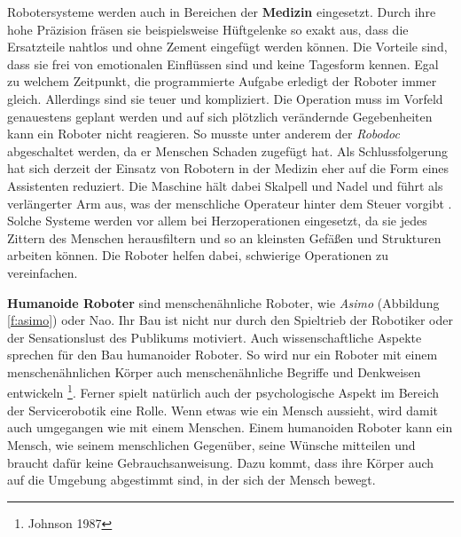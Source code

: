 Robotersysteme werden auch in Bereichen der \textbf{Medizin} eingesetzt. Durch ihre hohe Präzision fräsen sie beispielsweise Hüftgelenke so exakt aus, dass die Ersatzteile nahtlos und ohne Zement eingefügt werden können. Die Vorteile sind, dass sie frei von emotionalen Einflüssen sind und keine Tagesform kennen. Egal zu welchem Zeitpunkt, die programmierte Aufgabe erledigt der Roboter immer gleich. Allerdings sind sie teuer und kompliziert. Die Operation muss im Vorfeld genauestens geplant werden und auf sich plötzlich verändernde Gegebenheiten kann ein Roboter nicht reagieren. So musste unter anderem der \textit{Robodoc} abgeschaltet werden, da er Menschen Schaden zugefügt hat. Als Schlussfolgerung hat sich derzeit der Einsatz von Robotern in der Medizin eher auf die Form eines Assistenten reduziert. Die Maschine hält dabei Skalpell und Nadel und führt als verlängerter Arm aus, was der menschliche Operateur hinter dem Steuer vorgibt \cite{Haun2007}. Solche Systeme werden vor allem bei Herzoperationen eingesetzt, da sie jedes Zittern des Menschen herausfiltern und so an kleinsten Gefäßen und Strukturen arbeiten können. Die Roboter helfen dabei, schwierige Operationen zu vereinfachen.

\textbf{Humanoide Roboter} sind menschenähnliche Roboter, wie \textit{Asimo} (Abbildung \ref{f:asimo}) oder Nao. Ihr Bau ist nicht nur durch den Spieltrieb der Robotiker oder der Sensationslust des Publikums motiviert. Auch wissenschaftliche Aspekte sprechen für den Bau humanoider Roboter. So wird nur ein Roboter mit einem menschenähnlichen Körper auch menschenähnliche Begriffe und Denkweisen entwickeln \footnote{Johnson 1987}. Ferner spielt natürlich auch der psychologische Aspekt im Bereich der Servicerobotik eine Rolle. Wenn etwas wie ein Mensch aussieht, wird damit auch umgegangen wie mit einem Menschen. Einem humanoiden Roboter kann ein Mensch, wie seinem menschlichen Gegenüber, seine Wünsche mitteilen und braucht dafür keine Gebrauchsanweisung. Dazu kommt, dass ihre Körper auch auf die Umgebung abgestimmt sind, in der sich der Mensch bewegt.


